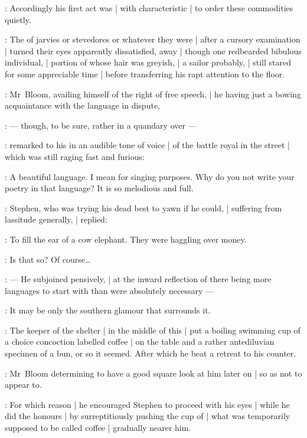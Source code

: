 :
Accordingly his first act was |
with characteristic  |
to order these commodities quietly.

:
The  of jarvies or stevedores or whatever they were |
after a cursory examination |
turned their eyes apparently dissatisfied, away |
though one redbearded bibulous individual, |
portion of whose hair was greyish, |
a sailor probably, |
still stared for some appreciable time |
before transferring his rapt attention to the floor.

:
Mr~Bloom, availing himself of the right of free speech, |
he having just a bowing acquaintance with the language in dispute,

:
    --- though, to be sure, rather in a quandary over  ---

:
remarked to his  in an audible tone of voice |
 of the battle royal in the street |
which was still raging fast and furious:

\Bloom:
A beautiful language.
I mean for singing purposes.
Why do you not write your poetry in that language?
It is so melodious and full.

:
Stephen, who was trying his dead best to yawn if he could, |
suffering from lassitude generally, |
replied:

\Stephen:
To fill the ear of a cow elephant.
They were haggling over money.

\Bloom:
Is that so?
Of course\ldots

:
    --- He subjoined pensively, |
        at the inward reflection of there being more languages to start with
        than were absolutely necessary ---

\Bloom:
It may be only the southern glamour that surrounds it.

:
The keeper of the shelter |
in the middle of this  |
put a boiling swimming cup of a choice concoction labelled coffee |
on the table and a rather antediluvian specimen of a bun, or so it seemed.
After which he beat a retreat to his counter.

:
Mr~Bloom determining to have a good square look at him later on |
so as not to appear to.

:
For which reason |
he encouraged Stephen to proceed with his eyes |
while he did the honours |
by surreptitiously pushing the cup of |
what was temporarily supposed to be called coffee |
gradually nearer him.

